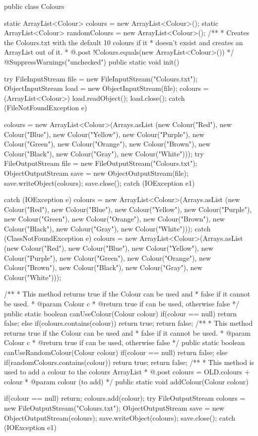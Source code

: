 \label{Colours-luokka}
\begin{javacode}
public class Colours {
	static ArrayList<Colour> colours = new ArrayList<Colour>();
	static ArrayList<Colour> randomColours =
		 new ArrayList<Colour>();
	/**
	 * Creates the Colours.txt with the default 10 colours if it
	 * doesn't exsist and creates an ArrayList out of it.
	 * @.post !Colours.equals(new ArrayList<Colour>())
	 */
	@SuppressWarnings("unchecked")
	public static void init() {
		try {
			FileInputStream file =
				new FileInputStream("Colours.txt");
			ObjectInputStream load =
				new ObjectInputStream(file);
			colours = (ArrayList<Colour>) load.readObject();
			load.close();
		} catch (FileNotFoundException e) {
			colours = new ArrayList<Colour>(Arrays.asList
			(new Colour("Red"), new Colour("Blue"),
			new Colour("Yellow"), new Colour("Purple"),
			new Colour("Green"), new Colour("Orange"),
			new Colour("Brown"), new Colour("Black"),
			new Colour("Gray"),
			new Colour("White")));
			try {
				FileOutputStream file =
				new FileOutputStream("Colours.txt");
				ObjectOutputStream save =
				new ObjectOutputStream(file);
				save.writeObject(colours);
				save.close();
			} catch (IOException e1) {
				
			}
		} catch (IOException e) {
			colours = new ArrayList<Colour>(Arrays.asList
			(new Colour("Red"), new Colour("Blue"),
			new Colour("Yellow"), new Colour("Purple"),
			new Colour("Green"), new Colour("Orange"),
			new Colour("Brown"), new Colour("Black"),
			new Colour("Gray"),
			new Colour("White")));
		} catch (ClassNotFoundException e) {
			colours = new ArrayList<Colour>(Arrays.asList
			(new Colour("Red"), new Colour("Blue"),
			new Colour("Yellow"), new Colour("Purple"),
			new Colour("Green"), new Colour("Orange"),
			new Colour("Brown"), new Colour("Black"),
			new Colour("Gray"),
			new Colour("White")));
		}
	}
	/**
	 * This method returns true if the Colour can be used and
	 * false if it cannot be used.
	 * @param Colour c
	 * @return true if can be used, otherwise false
	 */
	public static boolean canUseColour(Colour colour) {
		if(colour == null) return false;
		else if(colours.contains(colour)) return true;
		return false;
	}
	/**
	 * This method returns true if the Colour can be used and
	 * false if it cannot be used.
	 * @param Colour c
	 * @return true if can be used, otherwise false
	 */
	public static boolean canUseRandomColour(Colour colour) {
		if(colour == null) return false;
		else if(randomColours.contains(colour)) return true;
		return false;
	}
	/**
	 * This method is used to add a colour to the colours ArrayList
	 * @.post colours = OLD.colours + colour
	 * @param colour (to add)
	 */
	public static void addColour(Colour colour){
		if(colour == null) return;
		colours.add(colour);
		try {
			FileOutputStream colours =
				new FileOutputStream("Colours.txt");
			ObjectOutputStream save =
				new ObjectOutputStream(colours);
			save.writeObject(colours);
			save.close();
		} catch (IOException e1) {
			
}}}
\end{javacode}
